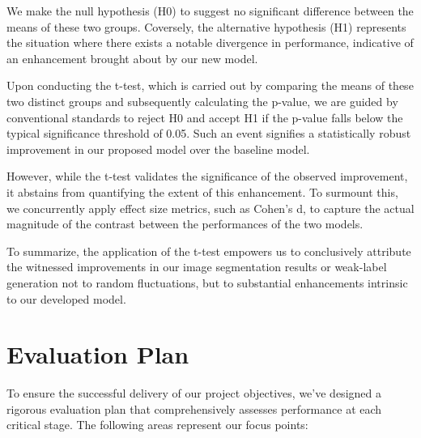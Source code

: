 We make the null hypothesis (H0) to suggest no significant difference between the means of these two groups. Coversely, the alternative hypothesis (H1) represents the situation where there exists a notable divergence in performance, indicative of an enhancement brought about by our new model.

Upon conducting the t-test, which is carried out by comparing the means of these two distinct groups and subsequently calculating the p-value, we are guided by conventional standards to reject H0 and accept H1 if the p-value falls below the typical significance threshold of 0.05. Such an event signifies a statistically robust improvement in our proposed model over the baseline model.

However, while the t-test validates the significance of the observed improvement, it abstains from quantifying the extent of this enhancement. To surmount this, we concurrently apply effect size metrics, such as Cohen's d, to capture the actual magnitude of the contrast between the performances of the two models.

To summarize, the application of the t-test empowers us to conclusively attribute the witnessed improvements in our image segmentation results or weak-label generation not to random fluctuations, but to substantial enhancements intrinsic to our developed model.



\section{Evaluation Plan}
To ensure the successful delivery of our project objectives, we've designed a rigorous evaluation plan that comprehensively assesses performance at each critical stage. The following areas represent our focus points:

